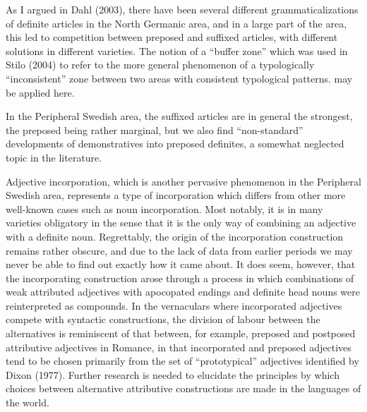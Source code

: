 As I argued in Dahl (2003), there have been several different grammaticalizations of definite articles in the North Germanic area, and in a large part of the area, this led to competition between preposed and suffixed articles, with different solutions in different varieties. The notion of a “buffer zone” which was used in Stilo (2004) to refer to the more general phenomenon of a typologically “inconsistent” zone between two areas with consistent typological patterns.  may be applied here.

In the Peripheral Swedish area, the suffixed articles are in general the strongest, the preposed being rather marginal, but we also find “non-standard” developments of demonstratives into preposed definites, a somewhat neglected topic in the literature. 

Adjective incorporation, which is another pervasive phenomenon in the Peripheral Swedish area, represents a type of incorporation which differs from other more well-known cases such as noun incorporation. Most notably, it is in many varieties obligatory in the sense that it is the only way of combining an adjective with a definite noun. Regrettably, the origin of the incorporation construction remains rather obscure, and due to the lack of data from earlier periods we may never be able to find out exactly how it came about. It does seem, however, that the incorporating construction arose through a process in which combinations of weak attributed adjectives with apocopated endings and definite head nouns were reinterpreted as compounds. In the vernaculars where incorporated adjectives compete with syntactic constructions, the division of labour between the alternatives is reminiscent of that between, for example, preposed and postposed attributive adjectives in Romance, in that incorporated and preposed adjectives tend to be chosen primarily from the set of “prototypical” adjectives identified by Dixon (1977). Further research is needed to elucidate the principles by which choices between alternative attributive constructions are made in the languages of the world.

